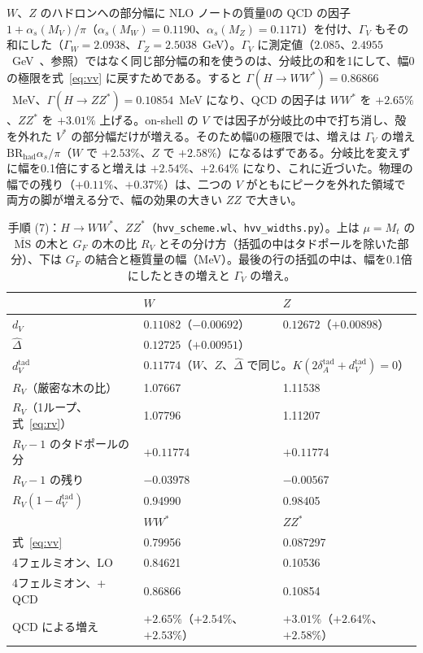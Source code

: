 \documentclass[a4paper,10pt]{ltjsarticle}
\newcommand{\MSbar}{\overline{\mathrm{MS}}}
\begin{document}
$W$、$Z$ のハドロンへの部分幅に NLO ノートの質量0の QCD の因子 $1+\alpha_s(M_V)/\pi$（$\alpha_s(M_W)=0.1190$、$\alpha_s(M_Z)=0.1171$）を付け、$\Gamma_V$ もその和にした（$\Gamma_W=2.0938$、$\Gamma_Z=2.5038$~GeV）。$\Gamma_V$ に測定値（$2.085$、$2.4955$~GeV~\cite{pdg24}、参照）ではなく同じ部分幅の和を使うのは、分岐比の和を1にして、幅0の極限を式~\eqref{eq:vv} に戻すためである。すると $\Gamma(H\to WW^*)=0.86866$~MeV、$\Gamma(H\to ZZ^*)=0.10854$~MeV になり、QCD の因子は $WW^*$ を $+2.65\%$、$ZZ^*$ を $+3.01\%$ 上げる。on-shell の $V$ では因子が分岐比の中で打ち消し、殻を外れた $V^*$ の部分幅だけが増える。そのため幅0の極限では、増えは $\Gamma_V$ の増え $\mathrm{BR}_{\mathrm{had}}\alpha_s/\pi$（$W$ で $+2.53\%$、$Z$ で $+2.58\%$）になるはずである。分岐比を変えずに幅を0.1倍にすると増えは $+2.54\%$、$+2.64\%$ になり、これに近づいた。物理の幅での残り（$+0.11\%$、$+0.37\%$）は、二つの $V$ がともにピークを外れた領域で両方の脚が増える分で、幅の効果の大きい $ZZ$ で大きい。

\begin{table}[tbp]
\centering\small
\caption{手順 (7)：$H\to WW^*$、$ZZ^*$（\texttt{hvv\_scheme.wl}、\texttt{hvv\_widths.py}）。上は $\mu=M_t$ の $\MSbar$ の木と $G_F$ の木の比 $R_V$ とその分け方（括弧の中はタドポールを除いた部分）、下は $G_F$ の結合と極質量の幅（MeV）。最後の行の括弧の中は、幅を0.1倍にしたときの増えと $\Gamma_V$ の増え。}
\label{tab:hvv}
\begin{tabular}{lll}
\toprule
 & $W$ & $Z$ \\
\midrule
$d_V$ & $0.11082$（$-0.00692$） & $0.12672$（$+0.00898$） \\
$\hat\Delta$ & \multicolumn{2}{l}{$0.12725$（$+0.00951$）} \\
$d_V^{\mathrm{tad}}$ & \multicolumn{2}{l}{$0.11774$（$W$、$Z$、$\hat\Delta$ で同じ。$K(2\delta_A^{\mathrm{tad}}+d_V^{\mathrm{tad}})=0$）} \\
$R_V$（厳密な木の比） & 1.07667 & 1.11538 \\
$R_V$（1ループ、式~\eqref{eq:rv}） & 1.07796 & 1.11207 \\
$R_V-1$ のタドポールの分 & $+0.11774$ & $+0.11774$ \\
$R_V-1$ の残り & $-0.03978$ & $-0.00567$ \\
$R_V(1-d_V^{\mathrm{tad}})$ & 0.94990 & 0.98405 \\
\midrule
 & $WW^*$ & $ZZ^*$ \\
\midrule
式~\eqref{eq:vv} & 0.79956 & 0.087297 \\
4フェルミオン、LO & 0.84621 & 0.10536 \\
4フェルミオン、+ QCD & 0.86866 & 0.10854 \\
QCD による増え & $+2.65\%$（$+2.54\%$、$+2.53\%$） & $+3.01\%$（$+2.64\%$、$+2.58\%$） \\
\bottomrule
\end{tabular}
\end{table}
\end{document}
